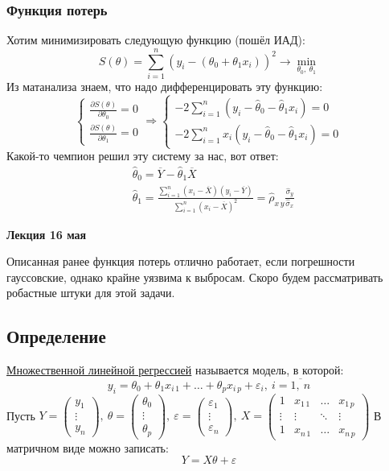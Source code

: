 \documentclass[12pt, a4paper]{article}
\begin{document}
\subsubsection*{Функция потерь}
Хотим минимизировать следующую функцию (пошёл ИАД):
\[
S(\theta) = \sum_{i = 1}^{n} {\left( y_i - (\theta_0 + \theta_1 x_i) \right)}^2 \to \min\limits_{\theta_0,\ \theta_1}
\]
Из матанализа знаем, что надо дифференцировать эту функцию:
\[
\begin{cases}
    \frac{\partial S(\theta)}{\partial \theta_0} = 0\\
    \frac{\partial S(\theta)}{\partial \theta_1} = 0
\end{cases} \Rightarrow \begin{cases}
    -2 \sum_{i = 1}^{n} \left( y_i - \hat\theta_0 - \hat\theta_1 x_i \right) = 0\\
    -2 \sum_{i = 1}^{n} x_i\left( y_i - \hat\theta_0 - \hat\theta_1 x_i \right) = 0
\end{cases}
\]
Какой-то чемпион решил эту систему за нас, вот ответ:
\[
\begin{aligned}
    &\hat \theta_0 = \overline{Y} - \hat \theta_1 \overline{X}\\
    &\hat \theta_1 = \frac{\sum_{i = 1}^{n} \left( x_i - \overline{X} \right) \left( y_i - \overline{Y} \right)}{\sum_{i = 1}^{n} {\left( x_i - \overline{X} \right)}^2} = \hat \rho_{x\, y} \frac{\hat \sigma_y}{ \hat \sigma_x}
\end{aligned}
\]

\begin{center}
    \bf Лекция 16 мая
\end{center}
Описанная ранее функция потерь отлично работает, если погрешности гауссовские, однако крайне уязвима к выбросам. Скоро будем рассматривать робастные штуки для этой задачи.
\subsection*{Определение}
\underline{Множественной линейной регрессией} называется модель, в которой:
\[
y_i = \theta_0 + \theta_1 x_{i\, 1} + \dots + \theta_p x_{i\, p} + \varepsilon_i,\ i = \overline{1,\ n}
\]
Пусть $Y = \begin{pmatrix}
    y_1\\
    \vdots\\
    y_n
\end{pmatrix},\ \theta = \begin{pmatrix}
    \theta_0\\
    \vdots\\
    \theta_p
\end{pmatrix},\ \varepsilon = \begin{pmatrix}
    \varepsilon_1\\
    \vdots\\
    \varepsilon_n
\end{pmatrix},\ X = \begin{pmatrix}
    1 & x_{1\, 1} & \dots & x_{1\, p}\\
    \vdots & \vdots & \ddots & \vdots\\
    1 & x_{n\, 1} & \dots & x_{n\, p}
\end{pmatrix}$
В матричном виде можно записать:
\[Y = X\theta + \varepsilon\]
\end{document}
